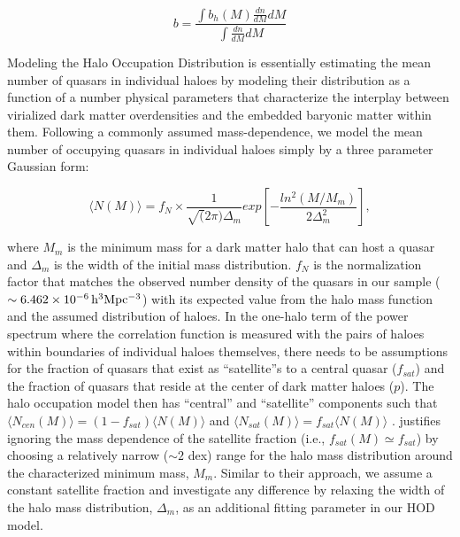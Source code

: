 \documentclass[useAMS,usenatbib]{mn2e}
\begin{document}


\begin{equation}
b = \frac{\int b_h(M) \frac{dn}{dM} dM}{\int \frac{dn}{dM} dM}
\end{equation}

Modeling the Halo Occupation Distribution is essentially estimating the mean 
number of quasars in individual haloes by modeling their distribution as a 
function of a number physical parameters that characterize the interplay between 
virialized dark matter overdensities and the embedded baryonic matter within 
them.  Following a commonly assumed mass-dependence, we model the mean number of 
occupying quasars in individual haloes simply by a three parameter Gaussian 
form: 

\begin{equation}
\langle N(M) \rangle = f_{N} \times \frac{1}{\sqrt(2\pi)\Delta_m} exp[-\frac{ln^2(M/M_m)}{2\Delta^{2}_m}],
\end{equation}

where $M_m$ is the minimum mass for a dark matter halo that can host a quasar 
and $\Delta_m$ is the width of the initial mass distribution. $f_N$ is the 
normalization factor that matches the observed number density of the quasars in 
our sample ($\sim6.462 \times 10^{-6} \, \rm h^3 Mpc^{-3}$) with its expected 
value from the halo mass function and the assumed distribution of haloes.
In the one-halo term of the power spectrum where the correlation function is 
measured with the pairs of haloes within boundaries of individual haloes 
themselves, there needs to be assumptions for the fraction of quasars that exist 
as ``satellite''s to a central quasar ($f_{sat}$) and the fraction of quasars 
that reside at the center of dark matter haloes ($p$). 
The halo occupation model then has ``central'' and ``satellite'' components such 
that $\langle N_{cen}(M)\rangle = (1-f_{sat})\langle N(M)\rangle$ and $\langle 
N_{sat}(M)\rangle = f_{sat} \langle N(M)\rangle$ \citep{bw02,kra04, zh05}.
\citet{ko12} justifies ignoring the mass dependence of the satellite fraction 
(i.e., $f_{sat}(M) \simeq f_{sat}$) by choosing a relatively narrow ($\sim 2$ 
dex) range for the halo mass distribution around the characterized minimum mass, 
$M_m$. Similar to their approach, we assume a constant satellite fraction and 
investigate any difference by relaxing the width of the halo mass distribution, 
$\Delta_m$, as an additional fitting parameter in our HOD model. 
\end{document}
